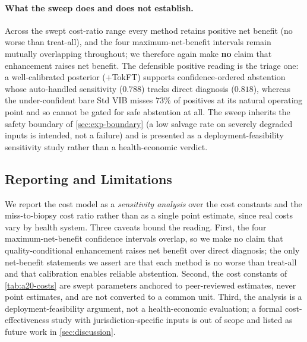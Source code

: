 \paragraph{What the sweep does and does not establish.}
Across the swept cost-ratio range every method retains positive net benefit (no worse than treat-all),
and the four maximum-net-benefit intervals remain mutually overlapping throughout; we therefore again
make \textbf{no} claim that enhancement raises net benefit. The defensible positive reading is the
triage one: a well-calibrated posterior (\qvib{}$+$TokFT) supports confidence-ordered abstention whose
auto-handled sensitivity ($0.788$) tracks direct diagnosis ($0.818$), whereas the under-confident bare
Std VIB misses $73\%$ of positives at its natural operating point and so cannot be gated for safe
abstention at all. The sweep inherits the safety boundary of \cref{sec:exp-boundary} (a low salvage rate
on severely degraded inputs is intended, not a failure) and is presented as a deployment-feasibility
sensitivity study rather than a health-economic verdict.

\subsection{Reporting and Limitations}\label{app:a20-limits}
We report the cost model as a \emph{sensitivity analysis} over the cost constants and the
miss-to-biopsy cost ratio rather than as a single point estimate, since real costs vary by health
system. Three caveats bound the reading. First, the four maximum-net-benefit confidence intervals
overlap, so we make no claim that quality-conditional enhancement raises net benefit over direct
diagnosis; the only net-benefit statements we assert are that each method is no worse than treat-all and
that calibration enables reliable abstention. Second, the cost constants of \cref{tab:a20-costs} are
swept parameters anchored to peer-reviewed estimates, never point estimates, and are not converted to a
common unit. Third, the analysis is a deployment-feasibility argument, not a health-economic evaluation;
a formal cost-effectiveness study with jurisdiction-specific inputs is out of scope and listed as future
work in \cref{sec:discussion}.
